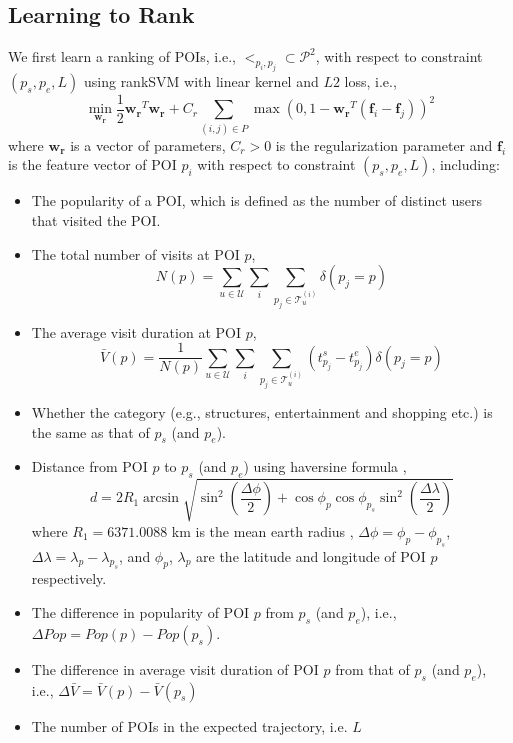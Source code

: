 \subsection{Learning to Rank}
\label{method:ranking}
We first learn a ranking of POIs, i.e., $<_{p_i, p_j} \subset \mathcal{P}^2$,
with respect to constraint $(p_s, p_e, L)$ 
using rankSVM with linear kernel and $L2$ loss\cite{lranksvm}, 
i.e.,
\begin{displaymath}
\min_{\mathbf{w_r}} \frac{1}{2} \mathbf{w_r}^T \mathbf{w_r} +
                  C_r \sum_{(i, j) \in P} \max \left( 0, 1 - \mathbf{w_r}^T (\mathbf{f}_i - \mathbf{f}_j) \right)^2
\end{displaymath}
where $\mathbf{w_r}$ is a vector of parameters, 
$C_r > 0$ is the regularization parameter and 
$\mathbf{f}_i$ is the feature vector of POI $p_i$ with respect to constraint $(p_s, p_e, L)$,
including:
\begin{itemize}
\item The popularity of a POI, which is defined as the number of distinct users that visited the POI\cite{ht10}.
\item The total number of visits at POI $p$,
      \begin{displaymath}
          N(p) = \sum_{u \in \mathcal{U}} \sum_i \sum_{p_j \in \mathcal{T}_u^{(i)}} \delta(p_j = p)
      \end{displaymath}
\item The average visit duration at POI $p$\cite{ijcai15},
      \begin{displaymath}
          \bar{V}(p) = \frac{1}{N(p)} \sum_{u \in \mathcal{U}} \sum_i \sum_{p_j \in \mathcal{T}_u^{(i)}} (t_{p_j}^s - t_{p_j}^e) \delta(p_j = p)
      \end{displaymath}
\item Whether the category (e.g., structures, entertainment and shopping etc.) is the same as that of $p_s$ (and $p_e$).
\item Distance from POI $p$ to $p_s$ (and $p_e$) using haversine formula \cite{haversine},
      \begin{displaymath}
      d = 2 R_1 \arcsin \sqrt{ \sin^2 \left( \frac{\Delta \phi}{2} \right) + 
           \cos \phi_p \cos \phi_{p_s} \sin^2 \left( \frac{\Delta \lambda}{2} \right) }
      \end{displaymath}
            where $R_1 = 6371.0088$ km is the mean earth radius \cite{earth_radius}, 
            $\Delta \phi = \phi_p - \phi_{p_s}$, $\Delta \lambda = \lambda_p - \lambda_{p_s}$,
            and $\phi_p$, $\lambda_p$ are the latitude and longitude of POI $p$ respectively.
\item The difference in popularity of POI $p$ from $p_s$ (and $p_e$),
      i.e., $\Delta Pop = Pop(p) - Pop(p_s)$.
\item The difference in average visit duration of POI $p$ from that of $p_s$ (and $p_e$),
      i.e., $\Delta \bar{V} = \bar{V}(p) - \bar{V}(p_s)$
\item The number of POIs in the expected trajectory, i.e. $L$
\end{itemize}

